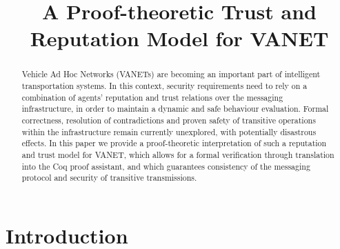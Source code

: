 \documentclass[compsoc, conference, letterpaper, 10pt, times]{IEEEtran}
\begin{document}
\title{A Proof-theoretic Trust and Reputation Model for VANET}


\author{
	}


\maketitle

\begin{abstract}
Vehicle Ad Hoc Networks (VANETs) are becoming an important part of intelligent transportation systems. In this context, security requirements need to rely on a combination of agents' reputation and trust relations over the messaging infrastructure, in order to maintain a dynamic and safe behaviour evaluation. Formal correctness, resolution of contradictions and proven safety of transitive operations within the infrastructure remain currently unexplored, with potentially disastrous effects. In this paper we provide a proof-theoretic  interpretation of such a reputation and trust model for VANET, which allows for a formal verification through translation into the Coq proof assistant, and which guarantees consistency of the messaging protocol and security of transitive transmissions.
\end{abstract}


\section{Introduction}\label{sec:intro}
\end{document}
